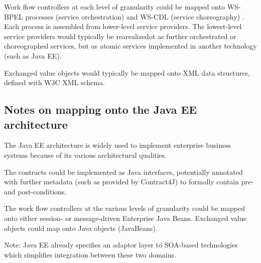 Work flow controllers at each level of granularity could be mapped onto
WS-BPEL processes (service orchestration) \cite{oasis:bpel} and WS-CDL (service choreography) \cite{w3c:cdl}.
Each process is assembled from lower-level service providers.
The lowest-level service providers would typically be
rearealizedot as further orchestrated or choreographed services, but as
atomic services implemented in another technology (such as Java EE).

Exchanged value objects would typically be mapped onto XML data structures,
defined with W3C XML schema. 


\subsection{Notes on mapping onto the Java EE architecture}

The Java EE architecture \cite{sun:javaee} is widely used to implement 
enterprise business systems because of its various architectural qualities.

The contracts could be implemented as Java interfaces, potentially annotated
with further metadata (such as provided by Contract4J) to formally
contain pre- and post-conditions.

The work flow controllers at the various levels of granularity could be
mapped onto either session- or message-driven Enterprise Java Beans. 
Exchanged value objects could map onto Java objects (JavaBeans).

Note: Java EE already specifies an adaptor layer to SOA-based technologies
which simplifies integration between these two domains. \cite{sun:soaWithJavaee}
